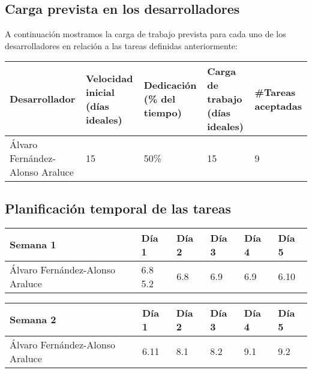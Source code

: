 \FloatBarrier

\subsection{Carga prevista en los desarrolladores}

A continuación mostramos la carga de trabajo prevista para cada uno de los desarrolladores en relación a las tareas definidas anteriormente:

\begin{table}[h]
	\centering
	\begin{tabular}{| p{3cm} | p{2cm} | p{2cm} | p{2cm} | p{2cm} |}
		\rowcolor[HTML]{329A9D} 
		{\color[HTML]{FFFFFF} \textbf{Desarrollador}} & {\color[HTML]{FFFFFF} \textbf{Velocidad inicial (días ideales)}} & {\color[HTML]{FFFFFF} \textbf{Dedicación (\% del tiempo)}} & {\color[HTML]{FFFFFF} \textbf{Carga de trabajo (días ideales)}} & {\color[HTML]{FFFFFF} \textbf{\#Tareas aceptadas}}  \\ \hline
		Álvaro Fernández-Alonso Araluce & 15 & 50\% & 15 & 9 \\ \hline
	\end{tabular}
\end{table}

\subsection{Planificación temporal de las tareas}

\begin{table}[h]
	\centering
	\begin{tabular}{| p{2cm} | p{2cm} | p{2cm} | p{2cm} | p{2cm} | p{2cm} |}
		\rowcolor[HTML]{329A9D} 
		 {\color[HTML]{FFFFFF} \textbf{Semana 1}} & {\color[HTML]{FFFFFF} \textbf{Día 1}} & {\color[HTML]{FFFFFF} \textbf{Día 2}} & {\color[HTML]{FFFFFF} \textbf{Día 3}} & {\color[HTML]{FFFFFF} \textbf{Día 4}}  & {\color[HTML]{FFFFFF} \textbf{Día 5}} \\ \hline
		Álvaro Fernández-Alonso Araluce & 6.8 5.2 & 6.8 & 6.9 & 6.9 & 6.10 \\ \hline
	\end{tabular}
\end{table}

\begin{table}[h]
	\centering
	\begin{tabular}{| p{2cm} | p{2cm} | p{2cm} | p{2cm} | p{2cm} | p{2cm} |}
		\rowcolor[HTML]{329A9D} 
		{\color[HTML]{FFFFFF} \textbf{Semana 2}} & {\color[HTML]{FFFFFF} \textbf{Día 1}} & {\color[HTML]{FFFFFF} \textbf{Día 2}} & {\color[HTML]{FFFFFF} \textbf{Día 3}} & {\color[HTML]{FFFFFF} \textbf{Día 4}}  & {\color[HTML]{FFFFFF} \textbf{Día 5}} \\ \hline
		Álvaro Fernández-Alonso Araluce & 6.11 & 8.1 & 8.2 & 9.1 & 9.2 \\ \hline
	\end{tabular}
\end{table}


